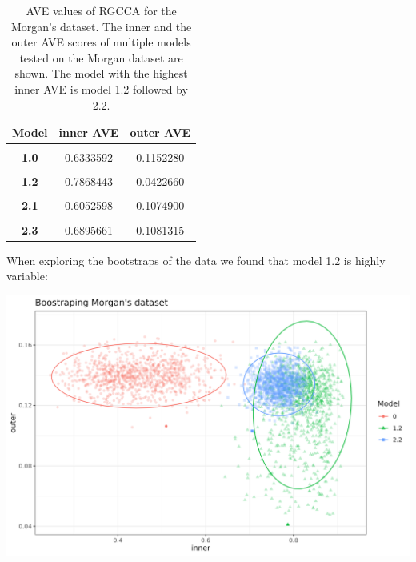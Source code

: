 \documentclass[
  12pt,
  a4paper,
  twoside,
  openright]{book}
\let\origfigure\figure
\let\endorigfigure\endfigure
\renewenvironment{figure}[1][2] {
    \expandafter\origfigure\expandafter[!htbp]
} {
    \endorigfigure
}
\begin{document}
\begin{table}[H]

\caption[AVE values of RGCCA for the Morgan's dataset.]{\label{tab:morgan-models-ave}AVE values of RGCCA for the Morgan's dataset. The inner and the outer AVE scores of multiple models tested on the Morgan dataset are shown. The model with the highest inner AVE is model 1.2 followed by 2.2.}
\centering
\begin{tabular}[t]{>{}c|c|c}
\hline
\textbf{Model} & \textbf{inner AVE} & \textbf{outer AVE}\\
\hline
\textbf{\cellcolor{gray!6}{0.0}} & \cellcolor{gray!6}{0.4735601} & \cellcolor{gray!6}{0.1098639}\\
\hline
\textbf{1.0} & 0.6333592 & 0.1152280\\
\hline
\textbf{\cellcolor{gray!6}{1.1}} & \cellcolor{gray!6}{0.2448234} & \cellcolor{gray!6}{0.1104746}\\
\hline
\textbf{1.2} & 0.7868443 & 0.0422660\\
\hline
\textbf{\cellcolor{gray!6}{2.0}} & \cellcolor{gray!6}{0.4404123} & \cellcolor{gray!6}{0.1088730}\\
\hline
\textbf{2.1} & 0.6052598 & 0.1074900\\
\hline
\textbf{\cellcolor{gray!6}{2.2}} & \cellcolor{gray!6}{0.6895661} & \cellcolor{gray!6}{0.1081315}\\
\hline
\textbf{2.3} & 0.6895661 & 0.1081315\\
\hline
\end{tabular}
\end{table}

When exploring the bootstraps of the data we found that model 1.2 is highly variable:

\begin{figure}
\includegraphics[width=1\linewidth]{images/morgan_bootstrap} \caption[AVE scores of bootstrapped models on Morgans' dataset.]{Inner and outer AVE scores of the bootstrapped models 0, 1.2 and 2.2 on the Morgan's dataset. Model 0 does not have sample data. Model 1.2 has microbiome, transcriptome and sample data in a single block and model 2.2 has microbiome, transcriptome and the sample data split in several blocks. Model 2.2 shows less variance than all models but lower inner values than model 1.2. Each point represents a bootstrapped sample (colored by model used).
The dispersion is shown by the ellipses.}\label{fig:morgan-bootstrap}
\end{figure}
\end{document}
